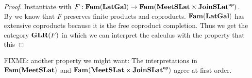 \begin{proof}
  Instantiate  with
  $F : \mathbf{Fam}(\mathbf{LatGal}) \to \mathbf{Fam}(\mathbf{MeetSLat} \times \mathbf{JoinSLat}^{\mathsf{op}})$. By
   we know that $F$ preserves finite products and
  coproducts. $\mathbf{Fam}(\mathbf{LatGal})$ has extensive coproducts because it is
  the free coproduct completion. Thus we get the category $\mathbf{GLR}(F)$ in
  which we can interpret the calculus with the property that this
\end{proof}

FIXME: another property we might want: The interpretations in
$\mathbf{Fam}(\mathbf{MeetSLat})$ and $\mathbf{Fam}(\mathbf{MeetSLat} \times \mathbf{JoinSLat}^{\mathsf{op}})$ agree at
first order.

